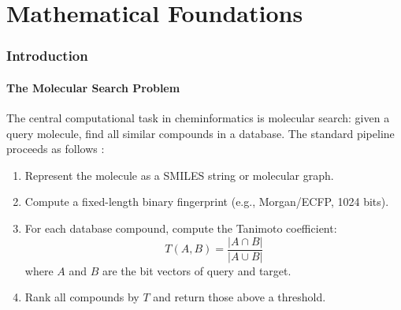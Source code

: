 \documentclass[11pt,twocolumn,a4paper]{article}
\theoremstyle{definition}
\theoremstyle{remark}
\begin{document}
\begin{abstract}
one oscillation-counting observation, and the address \emph{is} the search.

\medskip
\noindent\textbf{Keywords:} ternary phase space addressing, S-entropy coordinates, oscillation counting, molecular database search, ternary trie, bounded oscillatory systems, fuzzy search, prefix matching, cheminformatics, computational complexity

\end{abstract}

\tableofcontents
\newpage


\part{Mathematical Foundations}

\section{Introduction}
\label{sec:introduction}

\subsection{The Molecular Search Problem}

The central computational task in cheminformatics is molecular search: given a query molecule, find all similar compounds in a database. The standard pipeline proceeds as follows \citep{rogers2010, willett1998}:

\begin{enumerate}[nosep]
\item Represent the molecule as a SMILES string or molecular graph.
\item Compute a fixed-length binary fingerprint (e.g., Morgan/ECFP, 1024 bits).
\item For each database compound, compute the Tanimoto coefficient:
\begin{equation}
T(A, B) = \frac{|A \cap B|}{|A \cup B|}
\label{eq:tanimoto}
\end{equation}
where $A$ and $B$ are the bit vectors of query and target.
\item Rank all compounds by $T$ and return those above a threshold.
\end{enumerate}
\end{document}
